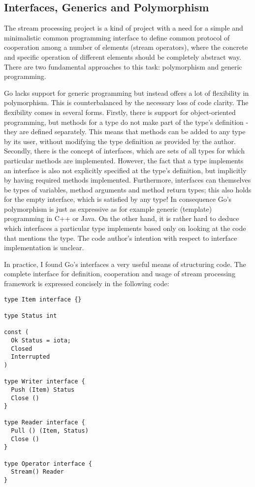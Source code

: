 \documentclass {article}
\begin{document}
\subsection {Interfaces, Generics and Polymorphism}

The stream processing project is a kind of project with a need for a simple and minimalistic common programming interface to define common protocol of cooperation among a number of elements (stream operators), where the concrete and specific operation of different elements should be completely abstract way. There are two fundamental approaches to this task: polymorphism and generic programming.

Go lacks support for generic programming but instead offers a lot of flexibility in polymorphism. This is counterbalanced by the necessary loss of code clarity. The flexibility comes in several forms. Firstly, there is support for object-oriented programming, but methods for a type do not make part of the type's definition - they are defined separately. This means that methods can be added to any type by its user, without modifying the type definition as provided by the author. Secondly, there is the concept of interfaces, which are sets of all types for which particular methods are implemented. However, the fact that a type implements an interface is also not explicitly specified at the type's definition, but implicitly by having required methods implemented. Furthermore, interfaces can themselves be types of variables, method arguments and method return types; this also holds for the empty interface, which is satisfied by any type! In consequence Go's polymorphism is just as expressive as for example generic (template) programming in C++ or Java. On the other hand, it is rather hard to deduce which interfaces a particular type implements based only on looking at the code that mentions the type. The code author's intention with respect to interface implementation is unclear.

In practice, I found Go's interfaces a very useful means of structuring code. The complete interface for definition, cooperation and usage of stream processing framework is expressed concisely in the following code:

\begin{lstlisting}
type Item interface {}

type Status int

const (
  Ok Status = iota;
  Closed
  Interrupted
)

type Writer interface {
  Push (Item) Status
  Close ()
}

type Reader interface {
  Pull () (Item, Status)
  Close ()
}

type Operator interface {
  Stream() Reader
}
\end{lstlisting}
\end{document}
